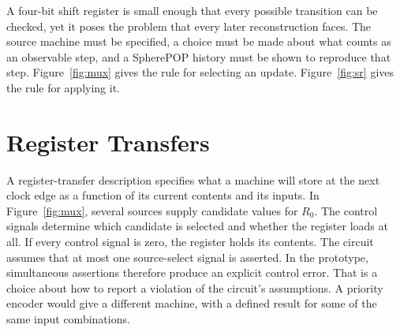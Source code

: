 \documentclass[11pt,oneside]{report}
\newcommand{\SP}{SpherePOP}
\theoremstyle{plain}
\theoremstyle{definition}
\theoremstyle{remark}
\begin{document}
A four-bit shift register is small enough that every possible transition can be checked, yet it poses the problem that every later reconstruction faces. The source machine must be specified, a choice must be made about what counts as an observable step, and a \SP{} history must be shown to reproduce that step. Figure~\ref{fig:mux} gives the rule for selecting an update. Figure~\ref{fig:sr} gives the rule for applying it.

\section{Register Transfers}

A register-transfer description specifies what a machine will store at the next clock edge as a function of its current contents and its inputs. In Figure~\ref{fig:mux}, several sources supply candidate values for $R_0$. The control signals determine which candidate is selected and whether the register loads at all. If every control signal is zero, the register holds its contents. The circuit assumes that at most one source-select signal is asserted. In the prototype, simultaneous assertions therefore produce an explicit control error. That is a choice about how to report a violation of the circuit's assumptions. A priority encoder would give a different machine, with a defined result for some of the same input combinations.
\end{document}
